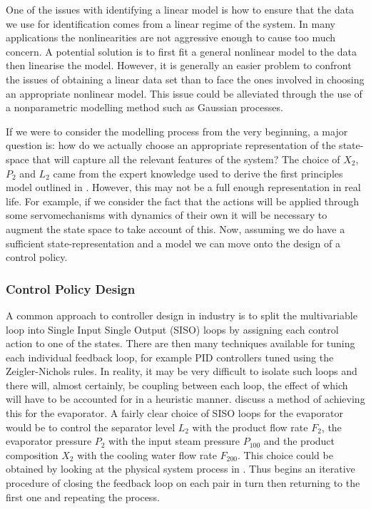 One of the issues with identifying a linear model is how to ensure that the data we use for identification comes from a linear regime of the system. In many applications the nonlinearities are not aggressive enough to cause too much concern. A potential solution is to first fit a general nonlinear model to the data then linearise the model. However, it is generally an easier problem to confront the issues of obtaining a linear data set than to face the ones involved in choosing an appropriate nonlinear model. This issue could be alleviated through the use of a nonparametric modelling method such as Gaussian processes.


If we were to consider the modelling process from the very beginning, a major question is: how do we actually choose an appropriate representation of the state-space that will capture all the relevant features of the system?
%
The choice of $X_2$, $P_2$ and $L_2$ came from the expert knowledge used to derive the first principles model outlined in . However, this may not be a full enough representation in real life. For example, if we consider the fact that the actions will be applied through some servomechanisms with dynamics of their own it will be necessary to augment the state space to take account of this. Now, assuming we do have a sufficient state-representation and a model we can move onto the design of a control policy.


\subsubsection{Control Policy Design}
A common approach to controller design in industry is to split the multivariable loop into Single Input Single Output (SISO) loops by assigning each control action to one of the states. There are then many techniques available for tuning each individual feedback loop, for example PID controllers tuned using the Zeigler-Nichols rules. In reality, it may be very difficult to isolate such loops and there will, almost certainly, be coupling between each loop, the effect of which will have to be accounted for in a heuristic manner. \cite{NeLe89} discuss a method of achieving this for the evaporator. A fairly clear choice of SISO loops for the evaporator would be to control the separator level $L_2$ with the product flow rate $F_2$, the evaporator pressure $P_2$ with the input steam pressure $P_{100}$ and the product composition $X_2$ with the cooling water flow rate $F_{200}$. This choice could be obtained by looking at the physical system process in . Thus begins an iterative procedure of closing the feedback loop on each pair in turn then returning to the first one and repeating the process.


